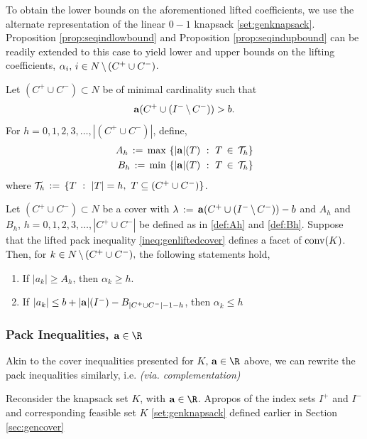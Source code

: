 \documentclass[10pt,twoside]{amsart}
\begin{document}
To obtain the lower bounds on the aforementioned lifted coefficients, we use the alternate representation of the linear $0-1$ knapsack \eqref{set:genknapsack}. Proposition \ref{prop:seqindlowbound} and Proposition \ref{prop:seqindupbound} can be readily extended to this case to yield lower and upper bounds on the lifting coefficients, $\alpha_i,\, i \in N\,\backslash\, (C^+ \cup C^-)$.

\begin{dfn}
  Let $(C^+ \cup C^-)\subset N$ be of minimal cardinality such that $$\mathbf{a}(C^+ \cup (I^-\,\backslash\, C^-)) > b.$$ For $h = 0,1,2,3,\ldots,|(C^+ \cup C^-)|$, define,
  \begin{align}
    A_h \,:=\, \max \,\left\{ {|\mathbf{a}|(T)} \ : \ {T \,\in\, \mathcal{T}_h} \right\} \label{def:Ah}\\
    B_h \,:=\, \min \,\left\{ {|\mathbf{a}|(T)} \ : \ {T \,\in\, \mathcal{T}_h} \right\} \label{def:Bh}
  \end{align}
  where $\mathcal{T}_h \,:=\, \left\{ {T} \ : \ {|T| = h,\,\, T \subseteq (C^+ \cup C^-)} \right\}$.
\end{dfn}

\begin{prop}
  Let $(C^+ \cup C^-) \subset N$ be a cover with $\lambda \,:=\, \mathbf{a}(C^+\cup (I^-\,\backslash\, C^-)) - b$ and $A_h$ and $B_h$, $h = 0,1,2,3,\ldots,|C^+ \cup C^-|$ be defined as in \eqref{def:Ah} and \eqref{def:Bh}. Suppose that the lifted pack inequality \eqref{ineq:genliftedcover} defines a facet of $\operatorname{conv}(K)$. Then, for $k\in N\,\backslash\, (C^+ \cup C^-),$ the following statements hold,
  \begin{enumerate}[label=(\roman{*})]
    \item If $|a_k| \geq A_h$, then $\alpha_k \geq h$.
    \item If $|a_k| \leq b + |\mathbf{a}|(I^-) - B_{|C^+ \cup C^-|-1-h}$, then $\alpha_k \leq h$
  \end{enumerate}
\end{prop}

\subsubsection{Pack Inequalities, $\a \in \R$}\hfill

\label{sec:genpack}
Akin to the cover inequalities presented for $K,\,\a\in \R$ above, we can rewrite the pack inequalities similarly, i.e. \textit{(via. complementation)}

Reconsider the knapsack set $K$, with $\a\in \R$. Apropos of the index sets $I^+$ and $I^-$ and corresponding feasible set $K$ \eqref{set:genknapsack} defined earlier in Section \ref{sec:gencover}
\end{document}

